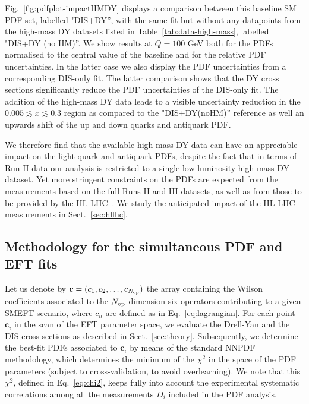 \documentclass[withindex,glossary]{cam-thesis}
\begin{document}
Fig.~\ref{fig:pdfplot-impactHMDY} displays a comparison
between this baseline SM PDF set, labelled "DIS+DY'', with
the same fit but without any datapoints from the high-mass DY datasets
listed in Table~\ref{tab:data-high-mass}, labelled "DIS+DY (no HM)''.
%
 We show results at $Q=100$ GeV both for the PDFs normalised to the
 central value of the baseline and for the relative PDF
 uncertainties. In the latter case we also display the PDF uncertainties from a corresponding DIS-only fit.
The latter comparison shows that the DY cross sections significantly reduce
the PDF uncertainties of the DIS-only fit.
%
The addition of the high-mass DY data leads to a visible  
uncertainty reduction in the $0.005 \lesssim x\lesssim  0.3$ region
as compared to the "DIS+DY(noHM)'' reference as well an upwards shift
of the up and down quarks and antiquark PDF.

We therefore find that the available high-mass DY data can
have an appreciable impact on the light quark and antiquark PDFs,
despite the fact that in terms of Run II data our  analysis is restricted to a single low-luminosity 
 high-mass DY dataset.
%
Yet more stringent constraints on the PDFs are expected from the measurements based
on the full Runs II and III datasets,
as well as from those to be provided by the HL-LHC~\cite{Khalek:2018mdn}.
%
We study the anticipated impact of the HL-LHC measurements in
Sect.~\ref{sec:hllhc}.


\subsection{Methodology for the simultaneous PDF and EFT fits}
\label{eq:jointfits}

Let us denote by ${\mathbf{c}}=(c_1,c_2,\ldots,c_{N_{\rm op}})$ the array containing
the Wilson coefficients associated to the $N_{\rm op}$ dimension-six
operators contributing to a given SMEFT scenario, where $c_n$ are
defined as in Eq.~\eqref{eq:lagrangian}. 
For each point ${\mathbf{c}_i}$ in the scan of the EFT parameter space, we evaluate
the Drell-Yan and the DIS cross sections as described in Sect.~\ref{sec:theory}.
%
Subsequently, we determine the best-fit
PDFs associated to ${\mathbf{c}_i}$ by means of the standard NNPDF methodology, which
determines the minimum of the $\chi^2$ in the space of the PDF
parameters (subject to cross-validation, to avoid overlearning).
%
We note that this $\chi^2$, defined in
Eq.~\eqref{eq:chi2}, keeps fully into account the experimental
systematic correlations among all the
measurements $D_i$ included in the PDF analysis. 
\end{document}
